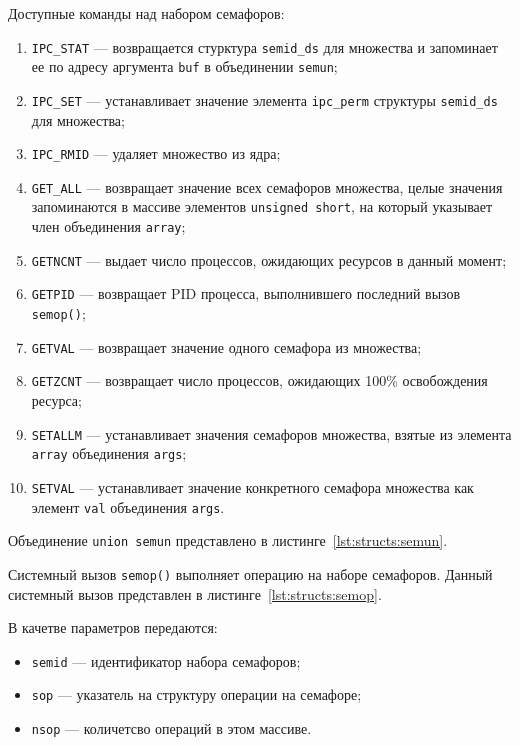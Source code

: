 Доступные команды над набором семафоров:
\begin{enumerate}
	\item \texttt{IPC\_STAT} --- возвращается стурктура \texttt{semid\_ds} для множества и запоминает ее по адресу аргумента  \texttt{buf} в объединении \texttt{semun};
	\item \texttt{IPC\_SET} --- устанавливает значение элемента \texttt{ipc\_perm} структуры \texttt{semid\_ds} для множества;
	\item \texttt{IPC\_RMID} --- удаляет множество из ядра;
	\item \texttt{GET\_ALL} --- возвращает значение всех семафоров множества, целые значения запоминаются в массиве элементов \texttt{unsigned short}, на который указывает член объединения \texttt{array};
	\item \texttt{GETNCNT} --- выдает число процессов, ожидающих ресурсов в данный момент;
	\item \texttt{GETPID} --- возвращает PID процесса, выполнившего последний вызов \texttt{semop()};
	\item \texttt{GETVAL} --- возвращает значение одного семафора из множества;
	\item \texttt{GETZCNT} --- возвращает число процессов, ожидающих 100\% освобождения ресурса;
	\item \texttt{SETALLM} --- устанавливает значения семафоров множества, взятые из элемента \texttt{array} объединения \texttt{args};
	\item \texttt{SETVAL} --- устанавливает значение конкретного семафора множества как элемент \texttt{val} объединения \texttt{args}.
\end{enumerate}

Объединение \texttt{union semun} представлено в листинге~\ref{lst:structs:semun}.



Системный вызов \texttt{semop()} выполняет операцию на наборе семафоров. Данный системный вызов представлен в листинге~\ref{lst:structs:semop}.



В качетве параметров передаются:
\begin{itemize}
	\item \texttt{semid} --- идентификатор набора семафоров;
	\item \texttt{sop} --- указатель на структуру операции на семафоре;
	\item \texttt{nsop} --- количетсво операций в этом массиве.
\end{itemize}

